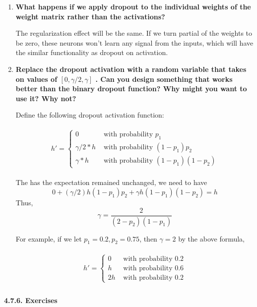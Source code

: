 \documentclass[11pt]{article}
\begin{document}
    \begin{enumerate}
\def\labelenumi{\arabic{enumi}.}
\setcounter{enumi}{6}
\item
  \textbf{What happens if we apply dropout to the individual weights of
  the weight matrix rather than the activations?}

  The regularization effect will be the same. If we turn partial of the
  weights to be zero, these neurons won't learn any signal from the
  inputs, which will have the similar functionality as dropout on
  activation.
\item
  \textbf{Replace the dropout activation with a random variable that
  takes on values of \([0,\gamma/2,\gamma]\) . Can you design something
  that works better than the binary dropout function? Why might you want
  to use it? Why not?}

  Define the following dropout activation function:

  \[\begin{split}\begin{aligned}
  h' =
  \begin{cases}
      0 & \text{ with probability } p_1 \\
      \gamma/2 * h & \text{ with probability } (1 - p_1)  p_2 \\
      \gamma * h & \text{ with probability } (1 - p_1)(1 - p_2)
  \end{cases}
  \end{aligned}\end{split}\]

  The has the expectation remained unchanged, we need to have
  \[ 0 + (\gamma/2) h (1 - p_1)  p_2 +  \gamma  h  (1 - p_1)(1 - p_2)  = h\]
  Thus, \[\gamma = \frac{2}{(2-p_2)(1-p_1)}\]

  For example, if we let \(p_1=0.2, p_2=0.75\), then \(\gamma = 2\) by
  the above formula,

  \[\begin{split}\begin{aligned}
  h' =
  \begin{cases}
      0 & \text{ with probability } 0.2 \\
      h & \text{ with probability } 0.6 \\
      2 h & \text{ with probability } 0.2
  \end{cases}
  \end{aligned}\end{split}\]
\end{enumerate}

    \paragraph{4.7.6. Exercises}\label{exercises}
\end{document}
